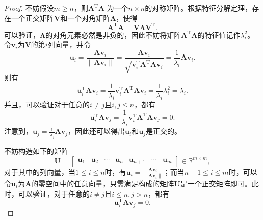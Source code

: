 \begin{proof}
    不妨假设\( m \geq n \)，则\( \mathbf{A}^{\mathrm{T}} \mathbf{A} \) 为一个\( n \times n \)的对称矩阵。根据特征分解定理，存在一个正交矩阵\( \mathbf{V} \)和一个对角矩阵\( \mathbf{\Lambda} \)，使得
    \[
        \mathbf{A}^{\mathrm{T}} \mathbf{A} = \mathbf{V} \mathbf{\Lambda} \mathbf{V}^{\mathrm{T}}.
    \]
    可以验证，\( \mathbf{\Lambda} \)的对角元素必然是非负的，因此不妨将矩阵\( \mathbf{A}^{\mathrm{T}} \mathbf{A} \)的特征值记作\( \lambda_i^2 \)。令\( \bm{v}_i \)为\( \mathbf{V} \)的第\( i \)列向量，并令
    \[
        \bm{u}_i = \frac{\mathbf{A} \bm{v}_i}{\|\mathbf{A} \bm{v}_i\|} = \frac{\mathbf{A} \bm{v}_i}{\sqrt{\bm{v}_i^{\mathrm{T}} \mathbf{A}^{\mathrm{T}} \mathbf{A} \bm{v}_i}} = \frac{1}{\lambda_i} \mathbf{A} \bm{v}_i.
    \]
    则有
    \begin{equation}\label{eq:svd_proof1}
        \bm{u}_i^{\mathrm{T}} \mathbf{A} \bm{v}_i = \frac{1}{\lambda_i} \bm{v}_i^{\mathrm{T}} \mathbf{A}^{\mathrm{T}} \mathbf{A} \bm{v}_i = \frac{1}{\lambda_i} \lambda_i^2 = \lambda_i.
    \end{equation}
    并且，可以验证对于任意的\( i \neq j  \)且\( i, j \leq n \)，都有
    \begin{equation}\label{eq:svd_proof2}
        \bm{u}_i^{\mathrm{T}} \mathbf{A} \bm{v}_j = \frac{1}{\lambda_i} \bm{v}_i^{\mathrm{T}} \mathbf{A}^{\mathrm{T}} \mathbf{A} \bm{v}_j = 0.
    \end{equation}
    注意到，\( \bm{u}_j = \frac{1}{\lambda_j} \mathbf{A} \bm{v}_j \)，因此还可以得出\( \bm{u}_i \)和\( \bm{u}_j \)是正交的。

    不妨构造如下的矩阵
    \[
        \mathbf{U} =
        \begin{bmatrix}
            \bm{u}_1 & \bm{u}_2 & \cdots & \bm{u}_n & \bm{u}_{n+1} & \cdots & \bm{u}_m
        \end{bmatrix} \in \mathbb{R}^{m \times m},
    \]
    对于其中的列向量，当\( 1 \leq i \leq n \)时，有\( \bm{u}_i = \frac{\mathbf{A} \bm{v}_i}{\|\mathbf{A} \bm{v}_i\|} \)；而当\( n + 1 \leq i \leq m \)时，可以令\( \bm{u}_i \)为\( \mathbf{A} \)的零空间中的任意向量，只需满足构成的矩阵\( \mathbf{U} \)是一个正交矩阵即可。此时，可以验证，对于任意的\( i \neq j  \)且\( i \leq n, j > n\)，都有
    \begin{equation}\label{eq:svd_proof3}
        \bm{u}_i^{\mathrm{T}} \mathbf{A} \bm{v}_j = 0.
    \end{equation}


\end{proof}
